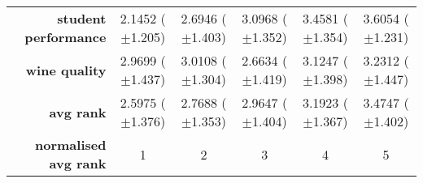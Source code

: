 \begin{table}[htbp]
{\begin{tabular}{r|ccccc}
			\textbf{student performance} & \cellcolor[rgb]{ .388,  .745,  .482}2.1452 ($\pm$1.205) & \cellcolor[rgb]{ .741,  .843,  .502}2.6946 ($\pm$1.403) & \cellcolor[rgb]{ 1,  .922,  .518}3.0968 ($\pm$1.352)    & \cellcolor[rgb]{ .984,  .561,  .451}3.4581 ($\pm$1.354) & \cellcolor[rgb]{ .973,  .412,  .42}3.6054 ($\pm$1.231)  \\
			\textbf{wine quality}        & \cellcolor[rgb]{ .925,  .898,  .51}2.9699 ($\pm$1.437)  & \cellcolor[rgb]{ 1,  .922,  .518}3.0108 ($\pm$1.304)    & \cellcolor[rgb]{ .388,  .745,  .482}2.6634 ($\pm$1.419) & \cellcolor[rgb]{ .988,  .659,  .471}3.1247 ($\pm$1.398) & \cellcolor[rgb]{ .973,  .412,  .42}3.2312 ($\pm$1.447)  \\
			\midrule
			\textbf{avg rank}            & \cellcolor[rgb]{ .388,  .745,  .482}2.5975 ($\pm$1.376) & \cellcolor[rgb]{ .671,  .824,  .498}2.7688 ($\pm$1.353) & \cellcolor[rgb]{ 1,  .922,  .518}2.9647 ($\pm$1.404)    & \cellcolor[rgb]{ .988,  .694,  .475}3.1923 ($\pm$1.367) & \cellcolor[rgb]{ .973,  .412,  .42}3.4747 ($\pm$1.402)  \\
			\midrule
			\textbf{normalised avg rank} & \cellcolor[rgb]{ .388,  .745,  .482}1                   & \cellcolor[rgb]{ .694,  .831,  .498}2                   & \cellcolor[rgb]{ 1,  .922,  .518}3                      & \cellcolor[rgb]{ .988,  .667,  .471}4                   & \cellcolor[rgb]{ .973,  .412,  .42}5                    \\
		\end{tabular}%

	}
\end{table}%

